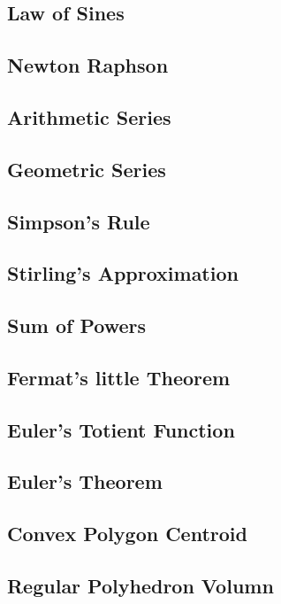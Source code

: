 \documentclass[11pt, oneside]{article}
\begin{document}
\subsection{Law of Sines}

\subsection{Newton Raphson}

\subsection{Arithmetic Series}

\subsection{Geometric Series}

\subsection{Simpson's Rule}

\subsection{Stirling's Approximation}

\subsection{Sum of Powers}

\subsection{Fermat's little Theorem}

\subsection{Euler's Totient Function}

\subsection{Euler's Theorem}

\subsection{Convex Polygon Centroid}

\subsection{Regular Polyhedron Volumn}
\end{document}
